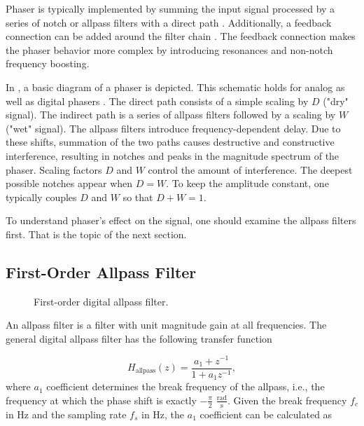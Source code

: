 Phaser is typically implemented by summing the input signal processed by a series of notch or allpass filters with a direct path \cite{Zoelzer2011}. Additionally, a feedback connection can be added around the filter chain \cite{Kiiski2016}. The feedback connection makes the phaser behavior more complex by introducing resonances and non-notch frequency boosting.

In , a basic diagram of a phaser is depicted. This schematic holds for analog as well as digital phasers \cite{PASPWEB2010}. The direct path consists of a simple scaling by $D$ ("dry" signal). The indirect path is a series of allpass filters followed by a scaling by $W$ ("wet" signal). The allpass filters introduce frequency-dependent delay. Due to these shifts, summation of the two paths causes destructive and constructive interference, resulting in notches and peaks in the magnitude spectrum of the phaser. Scaling factors $D$ and $W$ control the amount of interference. The deepest possible notches appear when $D = W$. To keep the amplitude constant, one typically couples $D$ and $W$ so that $D + W = 1$.

To understand phaser's effect on the signal, one should examine the allpass filters first. That is the topic of the next section.

\subsection{First-Order Allpass Filter}
\label{sec:first_order_allpass_filter}
\begin{figure}
    \centering
    
    \caption{First-order digital allpass filter.}
    \label{fig:first_order_allpass_filter}
\end{figure}

An allpass filter is a filter with unit magnitude gain at all frequencies. The general digital allpass filter has the following transfer function \cite{Zoelzer2011,PASPWEB2010,Kiiski2016}

\begin{equation}
    H_\text{allpass}(z) = \frac{a_1 + z^{-1}}{1 + a_1 z^{-1}},
    \label{eq:allpass_transfer_function}
\end{equation}
where $a_1$ coefficient determines the break frequency of the allpass, i.e., the frequency at which the phase shift is exactly $-\frac{\pi}{2}$ $\frac{\text{rad}}{\text{s}}$. Given the break frequency $f_c$ in Hz and the sampling rate $f_s$ in Hz, the $a_1$ coefficient can be calculated as

